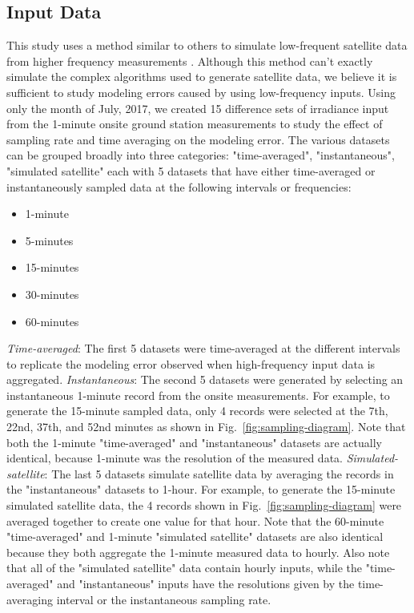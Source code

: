 \documentclass[conference]{IEEEtran}
\begin{document}
\subsection{Input Data}
This study uses a method similar to others to simulate low-frequent satellite data from higher frequency measurements \cite{Bowersox2021}. Although this method can't exactly simulate the complex algorithms used to generate satellite data, we believe it is sufficient to study modeling errors caused by using low-frequency inputs. Using only the month of July, 2017, we created 15 difference sets of irradiance input from the 1-minute onsite ground station measurements to study the effect of sampling rate and time averaging on the modeling error. The various datasets can be grouped broadly into three categories: "time-averaged", "instantaneous", "simulated satellite" each with 5 datasets that have either time-averaged or instantaneously sampled data at the following intervals or frequencies:

\begin{itemize}
    \item 1-minute
    \item 5-minutes
    \item 15-minutes
    \item 30-minutes
    \item 60-minutes
\end{itemize}

\emph{Time-averaged}: The first 5 datasets were time-averaged at the different intervals to replicate the modeling error observed when high-frequency input data is aggregated. \emph{Instantaneous}: The second 5 datasets were generated by selecting an instantaneous 1-minute record from the onsite measurements. For example, to generate the 15-minute sampled data, only 4 records were selected at the 7th, 22nd, 37th, and 52nd minutes as shown in Fig.~\ref{fig:sampling-diagram}. Note that both the 1-minute "time-averaged" and "instantaneous" datasets are actually identical, because 1-minute was the resolution of the measured data. \emph{Simulated-satellite}: The last 5 datasets simulate satellite data by averaging the records in the "instantaneous" datasets to 1-hour. For example, to generate the 15-minute simulated satellite data, the 4 records shown in Fig.~\ref{fig:sampling-diagram} were averaged together to create one value for that hour. Note that the 60-minute "time-averaged" and 1-minute "simulated satellite" datasets are also identical because they both aggregate the 1-minute measured data to hourly. Also note that all of the "simulated satellite" data contain hourly inputs, while the "time-averaged" and "instantaneous" inputs have the resolutions given by the time-averaging interval or the instantaneous sampling rate.
\end{document}
